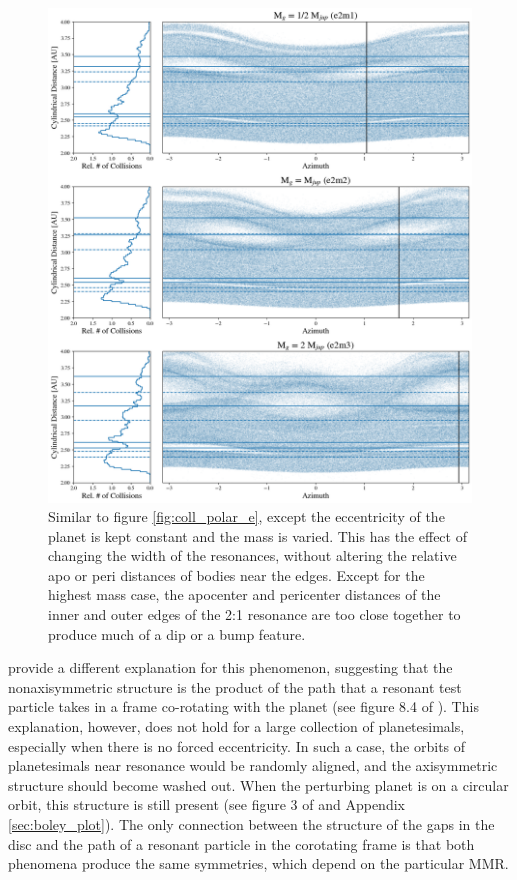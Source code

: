 \documentclass[fleqn,usenatbib]{mnras}
\begin{document}
\begin{figure}
    \includegraphics[width=\textwidth]{figures/coll_polar_m.png}
    \caption{Similar to figure \ref{fig:coll_polar_e}, except the eccentricity of the planet is kept constant and the mass is varied.
    This has the effect of changing the width of the resonances, without altering the relative apo or peri distances of
    bodies near the edges. Except for the highest mass case, the apocenter and pericenter distances of the inner and outer edges of the 2:1 
    resonance are too close together to produce much of a dip or a bump feature.\label{fig:coll_polar_m}}
\end{figure}

\citet{2016ApJ...818..159T} provide a different explanation for this phenomenon, suggesting that the nonaxisymmetric structure is the product 
of the path that a resonant test particle takes in a frame co-rotating with the planet (see figure 8.4 of \citet{1999ssd..book.....M}). This explanation, 
however, does not hold for a large collection of planetesimals, especially when there is no forced eccentricity. In such a case, the orbits of 
planetesimals near resonance would be randomly aligned, and the axisymmetric structure should become washed out. When the perturbing 
planet is on a circular orbit, this structure is still present (see figure 3 of \citet{2016ApJ...818..159T} and Appendix \ref{sec:boley_plot}). The only 
connection between the structure of the gaps in the disc and the path of a resonant particle in the corotating frame is that both phenomena produce the 
same symmetries, which depend on the particular MMR.
\end{document}
